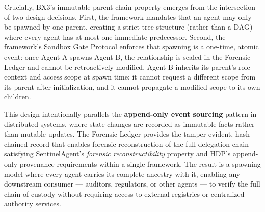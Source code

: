 Crucially, BX3's immutable parent chain property emerges from the intersection of two design decisions. First, the framework mandates that an agent may only be spawned by one parent, creating a strict tree structure (rather than a DAG) where every agent has at most one immediate predecessor. Second, the framework's Sandbox Gate Protocol enforces that spawning is a one-time, atomic event: once Agent A spawns Agent B, the relationship is sealed in the Forensic Ledger and cannot be retroactively modified. Agent B inherits its parent's role context and access scope at spawn time; it cannot request a different scope from its parent after initialization, and it cannot propagate a modified scope to its own children.

This design intentionally parallels the \textbf{append-only event sourcing} pattern in distributed systems, where state changes are recorded as immutable facts rather than mutable updates. The Forensic Ledger provides the tamper-evident, hash-chained record that enables forensic reconstruction of the full delegation chain — satisfying SentinelAgent's \textit{forensic reconstructibility} property and HDP's append-only provenance requirements within a single framework. The result is a spawning model where every agent carries its complete ancestry with it, enabling any downstream consumer — auditors, regulators, or other agents — to verify the full chain of custody without requiring access to external registries or centralized authority services.



